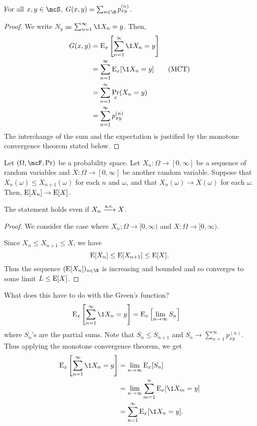 \begin{lemma} \label{thm:tnr:G}
    For all $x, y \in \mcS$, $G(x, y) = \sum_{n \in \N} p_{xy}^{(n)}$.
\end{lemma}
\begin{proof}
    We write $N_y$ as $\sum_{n=1}^{\infty} \1{X_n = y}$.
    Then, \begin{align*}
        G(x, y) &= \E_x\left[\sum_{n=1}^{\infty} \1{X_n = y}\right] \\
                &= \sum_{n=1}^{\infty} \E_x[\1{X_n = y}] \tag{MCT} \\
                &= \sum_{n=1}^{\infty} \Pr_x(X_n = y) \\
                &= \sum_{n=1}^{\infty} p_{xy}^{(n)}
    \end{align*}
    The interchange of the sum and the expectation is justified by the
    monotone convergence theorem stated below.
\end{proof}
\begin{fact*} \label{thm:tnr:mct}
    Let $(\Omega, \F, \Pr)$ be a probability space.
    Let $X_n\colon \Omega \to [0, \infty]$ be a sequence of random variables
    and $X\colon \Omega \to [0, \infty]$ be another random variable.
    Suppose that $X_n(\omega)\le X_{n+1}(\omega)$ for each $n$ and $\omega$,
    and that $X_n(\omega) \to X(\omega)$ for each $\omega$.
    Then, $\operatorname{\mathrm{E}}[X_n] \to \operatorname{\mathrm{E}}[X]$.
\end{fact*}
\begin{remark}
    The statement holds even if $X_n \xrightarrow{\text{a.s.}} X$.
\end{remark}
\begin{proof}
    We consider the case where $X_n\colon \Omega \to [0, \infty)$
    and $X\colon \Omega \to [0, \infty)$.

    Since $X_n \le X_{n+1} \le X$, we have \[
        \operatorname{\mathrm{E}}[X_n] \le \operatorname{\mathrm{E}}[X_{n+1}] \le \operatorname{\mathrm{E}}[X].
    \] Thus the sequence $(\E[X_n])_{n \in \N}$ is increasing and bounded
    and so converges to some limit $L \le \operatorname{\mathrm{E}}[X]$.
    \renewcommand{\qedsymbol}{\ensuremath{\dots}}
\end{proof}
What does this have to do with the Green's function?
\begin{align*}
    \E_x\left[\sum_{n=1}^{\infty} \1{X_n = y}\right]
        &= \E_x\left[\lim_{n \to \infty} S_n\right]
\end{align*}
where $S_n$'s are the partial sums.
Note that $S_n \le S_{n+1}$ and $S_n \to \sum_{n=1}^{\infty} p_{xy}^{(n)}$.
Thus applying the monotone convergence theorem, we get \begin{align*}
    \E_x\left[\sum_{n=1}^{\infty} \1{X_n = y}\right]
        &= \lim_{n \to \infty} \E_x[S_n] \\
        &= \lim_{n \to \infty} \sum_{m=1}^{n} \E_x[\1{X_m = y}] \\
        &= \sum_{n=1}^{\infty} \E_x[\1{X_n = y}].
\end{align*}

